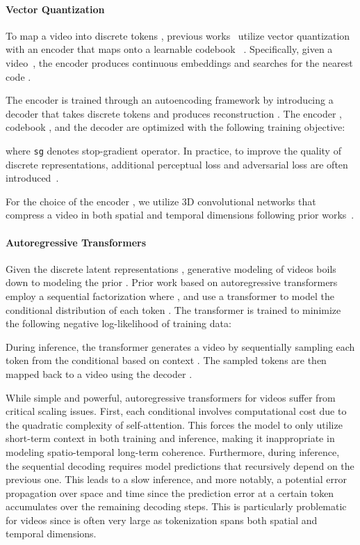\documentclass[10pt,twocolumn,letterpaper]{article}
\begin{document}
\paragraph{Vector Quantization}
To map a video  into discrete tokens , previous works~\cite{TATS, NUWA, LVT, MMVID, VPVQVAE} utilize vector quantization with an encoder  that maps  onto a learnable codebook ~\cite{VQVAE}.
Specifically, given a video~, the encoder produces continuous embeddings  and searches for the nearest code .

The encoder  is trained through an autoencoding framework by introducing a decoder  that takes discrete tokens  and produces reconstruction .
The encoder , codebook , and the decoder  are optimized with the following training objective:

where \texttt{sg} denotes stop-gradient operator.
In practice, to improve the quality of discrete representations, additional perceptual loss and adversarial loss are often introduced~\cite{VQGAN}.

For the choice of the encoder , we utilize 3D convolutional networks that compress a video in both spatial and temporal dimensions following prior works~\cite{videoGPT, TATS}.








\paragraph{Autoregressive Transformers}
Given the discrete latent representations , generative modeling of videos boils down to modeling the prior .
Prior work based on autoregressive transformers employ a sequential factorization  where , and use a transformer to model the conditional distribution of each token .
The transformer is trained to minimize the following negative log-likelihood of training data:


During inference, the transformer generates a video by sequentially sampling each token  from the conditional  based on context .
The sampled tokens  are then mapped back to a video using the decoder .

While simple and powerful, autoregressive transformers for videos suffer from critical scaling issues.
First, each conditional  involves  computational cost due to the quadratic complexity of self-attention.
This forces the model to only utilize short-term context in both training and inference, making it inappropriate in modeling spatio-temporal long-term coherence.
Furthermore, during inference, the sequential decoding requires  model predictions that recursively depend on the previous one.
This leads to a slow inference, and more notably, a potential error propagation over space and time since the prediction error at a certain token accumulates over the remaining decoding steps.
This is particularly problematic for videos since  is often very large as tokenization spans both spatial and temporal dimensions.
\end{document}
